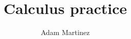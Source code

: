 \documentclass{article}
\title{Calculus practice}
\author{Adam Martinez}
\date{}
\begin{document}
\maketitle

\section*{}
\end{document}
